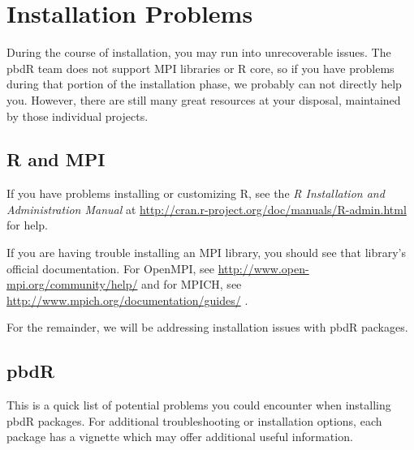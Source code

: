\section{Installation Problems}

During the course of installation, you may run into unrecoverable issues.  The pbdR team does not support MPI libraries or R core, so if you have problems during that portion of the installation phase, we probably can not directly help you.  However, there are still many great resources at your disposal, maintained by those individual projects.

\subsection{R and MPI}

If you have problems installing or customizing R, see the \emph{R Installation and Administration Manual} at \url{http://cran.r-project.org/doc/manuals/R-admin.html} for help.

If you are having trouble installing an MPI library, you should see that library's official documentation.  For OpenMPI, see \url{http://www.open-mpi.org/community/help/} and for MPICH, see \url{http://www.mpich.org/documentation/guides/} .

For the remainder, we will be addressing installation issues with pbdR packages.

\subsection{pbdR}\label{sec:porblam}

This is a quick list of potential problems you could encounter when installing pbdR packages.  For additional troubleshooting or installation options, each package has a vignette which may offer additional useful information.

